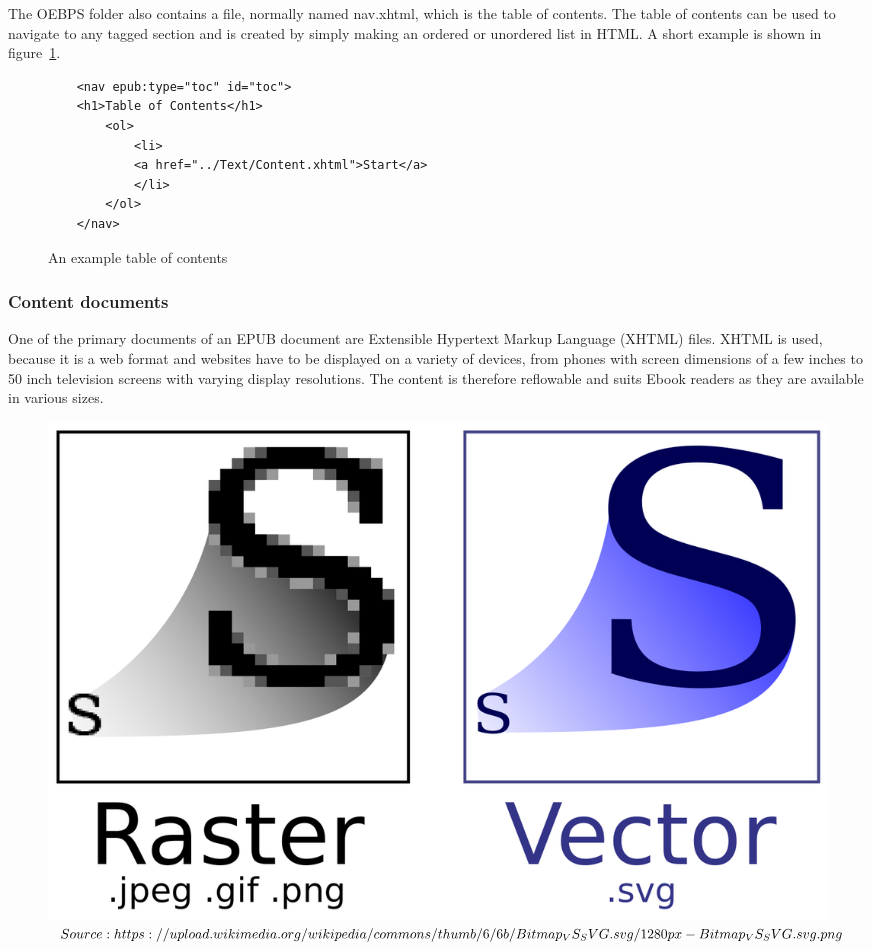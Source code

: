 The OEBPS folder also contains a file, normally named nav.xhtml, which is the table of contents. The table of contents can be used to navigate to any tagged section and is created by simply making an ordered or unordered list in HTML. A short example is shown in figure~\ref{fig:tableOfContents}. 

\begin{figure}
	\begin{lstlisting}
	<nav epub:type="toc" id="toc">
	<h1>Table of Contents</h1>
		<ol>
			<li>
			<a href="../Text/Content.xhtml">Start</a>
			</li>
		</ol>
	</nav>		
	\end{lstlisting}
	\caption{An example table of contents}
	\label{fig:tableOfContents}
\end{figure}

\subsubsection{Content documents}

One of the primary documents of an EPUB document are Extensible Hypertext Markup Language (XHTML) files. XHTML is used, because it is a web format and websites have to be displayed on a variety of devices, from phones with screen dimensions of a few inches to 50 inch television screens with varying display resolutions. The content is therefore reflowable and suits Ebook readers as they are available in various sizes. 

\begin{figure}[h]
	\begin{center}
		\includegraphics[width=\linewidth/2]{figures/bitmapVsSvg.png}
	\end{center}
	
	\caption{$Source: https://upload.wikimedia.org/wikipedia/commons/thumb/\\6/6b/Bitmap_VS_SVG.svg/1280px-Bitmap_VS_SVG.svg.png$}
	\label{fig:bitmapSvg}
\end{figure}


